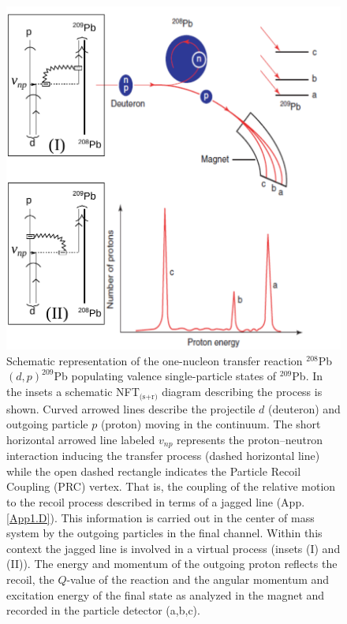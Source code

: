 \begin{figure}[h!]
\centerline {
\includegraphics*[width=12cm]{introduccion/figs/figintro2}
}
\caption{Schematic  representation of the one-nucleon transfer reaction $^{208}$Pb$(d,p)^{209}$Pb populating  valence single-particle states of $^{209}$Pb. In the insets a schematic NFT$_{\text{(s+r)}}$ diagram describing the process is shown. Curved arrowed lines describe the projectile $d$ (deuteron) and outgoing particle $p$ (proton) moving in the continuum. The short horizontal arrowed line labeled $v_{np}$ represents the proton--neutron interaction inducing the transfer process (dashed horizontal line) while the  open dashed rectangle indicates the Particle Recoil Coupling (PRC) vertex. That is,  the coupling of the relative motion to the recoil process described in terms of a jagged line (App. \ref{App1.D}). This information is carried out in the center of mass system by the outgoing particles in the final channel. Within this context the jagged line is involved in a virtual process (insets (I) and (II)). The energy and momentum of the outgoing proton reflects the recoil, the  $Q$-value of the reaction and the angular momentum and excitation energy of the final state as analyzed in the magnet and recorded in the particle detector (a,b,c).}
\label{figintro2}
\end{figure}

